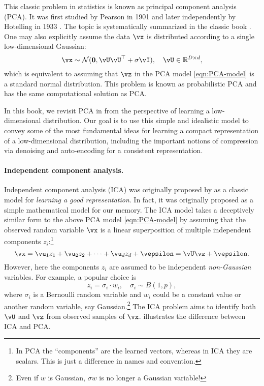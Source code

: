 \documentclass[../../book-main.tex]{subfiles}
\begin{document}
This classic problem in statistics is known as principal component analysis (PCA). It was first studied by Pearson in 1901 \cite{Pearson1901} and later independently by Hotelling in 1933 \cite{Hotelling1933}. The topic is systematically summarized in the classic book \cite{Jolliffe1986,JolliffeI2002}.
One may also explicitly assume the data \(\vx\) is distributed according to a single low-dimensional Gaussian:
\begin{equation}
    \vx \sim \mathcal{N}(\vzero, \vU\vU^{\top} + \sigma \vI), \quad \vU \in \R^{D\times d},
\end{equation}
which is equivalent to assuming that \(\vz\) in the PCA model \eqref{eqn:PCA-model} is a standard normal distribution. This problem is known as probabilistic PCA \cite{TippingM1999} and has the same computational solution as PCA. 

In this book, we revisit PCA in  from the perspective of learning a low-dimensional distribution. Our goal is to use this simple and idealistic model to convey some of the most fundamental ideas for learning a compact representation of a low-dimensional distribution, including the important notions of compression via denoising and auto-encoding for a consistent representation.
\paragraph{Independent component analysis.}
Independent component analysis (ICA) was originally proposed by \cite{Ans-1985} as a classic model for \textit{learning a good representation}. In fact, it was originally proposed as a simple mathematical model for our memory. The ICA model takes a deceptively similar form to the above PCA model \eqref{eqn:PCA-model} by assuming that the observed random variable \(\vx\) is a linear superposition of multiple independent components \(z_{i}\):\footnote{In PCA the ``components'' are the learned vectors, whereas in ICA they are scalars. This is just a difference in names and convention.}
\begin{equation}
    \vx = \vu_{1} z_{1} + \vu_{2} z_{2} + \cdots + \vu_{d} z_{d}  + \vepsilon =  \vU \vz + \vepsilon.
    \label{eqn:ICA-model}
\end{equation}
However, here the components \(z_{i}\) are assumed to be independent \textit{non-Gaussian} variables. For example, a popular choice is
\begin{equation}
    z_{i} = \sigma_{i} \cdot w_{i}, \quad \sigma_{i} \sim B(1,p),
    \label{eqn:ICA-modes}
\end{equation}
where \(\sigma_{i}\) is a Bernoulli random variable and \(w_{i}\) could be a constant value or another random variable, say Gaussian.\footnote{Even if \(w\) is Gaussian, \(\sigma w\) is no longer a Gaussian variable!} The ICA problem aims to identify both \(\vU\) and \(\vz\) from observed samples of \(\vx\).  illustrates the difference between ICA and PCA.
\end{document}
